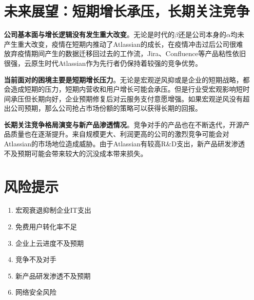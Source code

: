 \section{未来展望：短期增长承压，长期关注竞争}
\textbf{公司基本面与增长逻辑没有发生重大改变}。无论是时代的$\beta$还是公司本身的$\alpha$均未产生重大改变，疫情在短期内推动了Atlassian的成长，在疫情冲击过后公司很难放弃疫情期间产生的数据迁移回过去的工作流，Jira、Confluence等产品粘性依旧很强，云原生时代Atlassian作为先行者仍保持着较强的竞争优势。

\textbf{当前面对的困境主要是短期增长压力}。无论是宏观逆风抑或是企业的短期战略，都会造成短期的压力，短期内营收和用户增长可能会承压。但是行业受宏观影响短时间承压但长期向好，企业预期修复后对云服务支付意愿增强。如果宏观逆风没有超出公司预期，那么公司抢占市场份额的策略可以获得长期的回报。

\textbf{长期关注竞争格局演变与新产品渗透情况}。竞争对手的产品也在不断迭代，开源产品质量也在逐渐提升。来自规模更大、利润更高的公司的激烈竞争可能会对 Atlassian的市场地位造成威胁。由于Atlassian有较高R\&D支出，新产品研发渗透不及预期可能会带来较大的沉没成本带来损失。
\section{风险提示}
\begin{enumerate}
    \item 宏观衰退抑制企业IT支出
    \item 免费用户转化率不足
    \item 企业上云进度不及预期
    \item 竞争不及对手
    \item 新产品研发渗透不及预期
    \item 网络安全风险
\end{enumerate}
